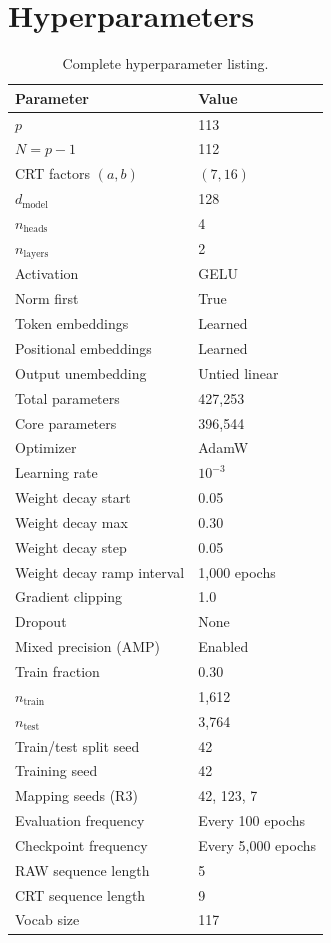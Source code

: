 \documentclass[11pt,a4paper]{article}
\begin{document}
\section{Hyperparameters}

\begin{table}[h]
\centering
\caption{Complete hyperparameter listing.}
\begin{tabular}{ll}
\toprule
Parameter & Value \\
\midrule
$p$ & 113 \\
$N = p - 1$ & 112 \\
CRT factors $(a, b)$ & $(7, 16)$ \\
$d_{\mathrm{model}}$ & 128 \\
$n_{\mathrm{heads}}$ & 4 \\
$n_{\mathrm{layers}}$ & 2 \\
Activation & GELU \\
Norm first & True \\
Token embeddings & Learned \\
Positional embeddings & Learned \\
Output unembedding & Untied linear \\
Total parameters & 427,253 \\
Core parameters & 396,544 \\
Optimizer & AdamW \\
Learning rate & $10^{-3}$ \\
Weight decay start & 0.05 \\
Weight decay max & 0.30 \\
Weight decay step & 0.05 \\
Weight decay ramp interval & 1,000 epochs \\
Gradient clipping & 1.0 \\
Dropout & None \\
Mixed precision (AMP) & Enabled \\
Train fraction & 0.30 \\
$n_{\mathrm{train}}$ & 1,612 \\
$n_{\mathrm{test}}$ & 3,764 \\
Train/test split seed & 42 \\
Training seed & 42 \\
Mapping seeds (R3) & 42, 123, 7 \\
Evaluation frequency & Every 100 epochs \\
Checkpoint frequency & Every 5,000 epochs \\
RAW sequence length & 5 \\
CRT sequence length & 9 \\
Vocab size & 117 \\
\bottomrule
\end{tabular}
\end{table}
\end{document}
